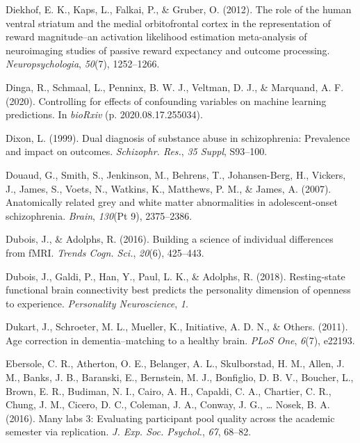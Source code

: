 \documentclass[11pt,american,a4paper,oneside,]{memoir} %
\begin{document}
\leavevmode\hypertarget{ref-diekhof2012role}{}%
Diekhof, E. K., Kaps, L., Falkai, P., \& Gruber, O. (2012). The role of the human ventral striatum and the medial orbitofrontal cortex in the representation of reward magnitude--an activation likelihood estimation meta-analysis of neuroimaging studies of passive reward expectancy and outcome processing. \emph{Neuropsychologia}, \emph{50}(7), 1252--1266.

\leavevmode\hypertarget{ref-Dinga2020-si}{}%
Dinga, R., Schmaal, L., Penninx, B. W. J., Veltman, D. J., \& Marquand, A. F. (2020). Controlling for effects of confounding variables on machine learning predictions. In \emph{bioRxiv} (p. 2020.08.17.255034).

\leavevmode\hypertarget{ref-Dixon1999-kl}{}%
Dixon, L. (1999). Dual diagnosis of substance abuse in schizophrenia: Prevalence and impact on outcomes. \emph{Schizophr. Res.}, \emph{35 Suppl}, S93--100.

\leavevmode\hypertarget{ref-Douaud2007-sw}{}%
Douaud, G., Smith, S., Jenkinson, M., Behrens, T., Johansen-Berg, H., Vickers, J., James, S., Voets, N., Watkins, K., Matthews, P. M., \& James, A. (2007). Anatomically related grey and white matter abnormalities in adolescent-onset schizophrenia. \emph{Brain}, \emph{130}(Pt 9), 2375--2386.

\leavevmode\hypertarget{ref-Dubois2016-zz}{}%
Dubois, J., \& Adolphs, R. (2016). Building a science of individual differences from fMRI. \emph{Trends Cogn. Sci.}, \emph{20}(6), 425--443.

\leavevmode\hypertarget{ref-dubois2018resting}{}%
Dubois, J., Galdi, P., Han, Y., Paul, L. K., \& Adolphs, R. (2018). Resting-state functional brain connectivity best predicts the personality dimension of openness to experience. \emph{Personality Neuroscience}, \emph{1}.

\leavevmode\hypertarget{ref-Dukart2011-aq}{}%
Dukart, J., Schroeter, M. L., Mueller, K., Initiative, A. D. N., \& Others. (2011). Age correction in dementia--matching to a healthy brain. \emph{PLoS One}, \emph{6}(7), e22193.

\leavevmode\hypertarget{ref-Ebersole2016-cr}{}%
Ebersole, C. R., Atherton, O. E., Belanger, A. L., Skulborstad, H. M., Allen, J. M., Banks, J. B., Baranski, E., Bernstein, M. J., Bonfiglio, D. B. V., Boucher, L., Brown, E. R., Budiman, N. I., Cairo, A. H., Capaldi, C. A., Chartier, C. R., Chung, J. M., Cicero, D. C., Coleman, J. A., Conway, J. G., \ldots{} Nosek, B. A. (2016). Many labs 3: Evaluating participant pool quality across the academic semester via replication. \emph{J. Exp. Soc. Psychol.}, \emph{67}, 68--82.
\end{document}
